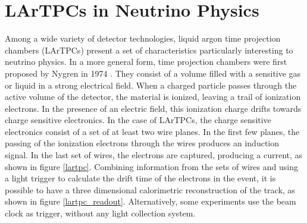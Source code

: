 
\label{Chapter:2}

\section{LArTPCs in Neutrino Physics}
Among a wide variety of detector technologies, liquid argon time projection chambers (LArTPCs) present a set of characteristics particularly interesting to neutrino physics. 
In a more general form, time projection chambers were first proposed by Nygren in 1974 \cite{Nygren}. They consist of a volume filled with a sensitive gas or liquid in a strong electrical field. When a charged particle passes through the active volume of the detector, the material is ionized, leaving a trail of ionization electrons. In the presence of an electric field, this ionization charge drifts towards charge sensitive electronics.
In the case of LArTPCs, the charge sensitive electronics consist of a set of at least two wire planes. In the first few planes, the passing of the ionization electrons through the wires produces an induction signal. In the last set of wires, the electrons are captured, producing a current, as shown in figure \ref{lartpc}. Combining information from the sets of wires and using a light trigger to calculate the drift time of the electrons in the event, it is possible to have a three dimensional calorimetric reconstruction of the track, as shown in figure \ref{lartpc_readout}. Alternatively, some experiments use the beam clock as trigger, without any light collection system. 
%

